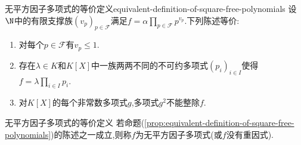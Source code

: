 \begin{proposition}{无平方因子多项式的等价定义}{equivalent-definition-of-square-free-polynomials}
	设$\N$中的有限支撑族$\left(v_{p}\right)_{p\in\mathscr{F}}$满足$f=\alpha\prod\limits_{p\in\mathscr{F}}p^{v_{p}}$.下列陈述等价:
	\begin{enumerate}
		\item 对每个$p\in\mathscr{F}$有$v_{p}\leq 1$.
		\item 存在$\lambda\in K$和$K\left[X\right]$中一族两两不同的不可约多项式$\left(p_{i}\right)_{i\in I}$使得$f=\lambda\prod\limits_{i\in I}p_{i}$.
		\item 对$K\left[X\right]$的每个非常数多项式$g$,多项式$g^{2}$不能整除$f$.
	\end{enumerate}
\end{proposition}

\begin{definition}{无平方因子多项式的等价定义}{}
	若命题(\ref{prop:equivalent-definition-of-square-free-polynomials})的陈述之一成立,则称$f$为无平方因子多项式(或$f$没有重因式).
\end{definition}









































